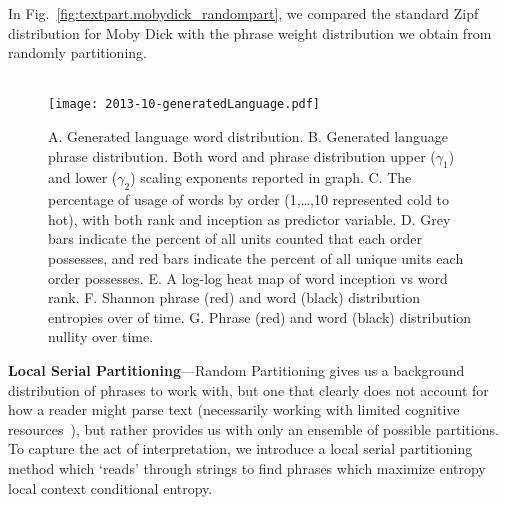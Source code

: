 












In Fig.~\ref{fig:textpart.mobydick_randompart}, we compared
the standard Zipf distribution for Moby Dick with the 
phrase weight distribution we obtain from randomly partitioning.\\
\\


\begin{figure*}[tbp!]
  \centering
  \texttt{[image: 2013-10-generatedLanguage.pdf]}
  \caption{
    A. Generated language word distribution. 
    B. Generated language phrase distribution. 
    Both word and phrase distribution upper ($\gamma_{1}$) and lower ($\gamma_{2}$) 
    scaling exponents reported in graph. 
    C. The percentage of usage of words by order (1,\ldots,10 represented cold to hot), 
    with both rank and inception as predictor variable. 
    D. Grey bars indicate the percent of all units counted that each order possesses, 
    and red bars indicate the percent of all unique units each order possesses. 
    E. A log-log heat map of word inception vs word rank. 
    F. Shannon phrase (red) and word (black) distribution entropies over of time. 
    G. Phrase (red) and word (black) distribution nullity over time.
  }
  \label{fig:textpart.generatedlanguage}
\end{figure*}



\textbf{Local Serial Partitioning}---Random Partitioning gives us a background distribution
of phrases to work with, but one that clearly does not account for how a
reader might parse text
(necessarily working with limited cognitive resources~\cite{levy????a}),
but rather provides us with only an ensemble of possible partitions.
To capture the act of interpretation, we introduce a local serial
partitioning method 
which `reads' through strings to find phrases which
maximize entropy local context conditional entropy.

